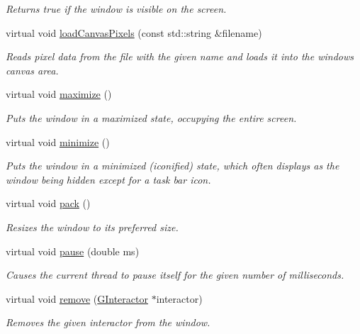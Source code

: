 \begin{DoxyCompactItemize}
\begin{DoxyCompactList}\small\item\em Returns true if the window is visible on the screen. \end{DoxyCompactList}\item 
virtual void \mbox{\hyperlink{classGWindow_ae2462f15e288c06c5136e31a8ac8151c}{load\+Canvas\+Pixels}} (const std\+::string \&filename)
\begin{DoxyCompactList}\small\item\em Reads pixel data from the file with the given name and loads it into the window\textquotesingle{}s canvas area. \end{DoxyCompactList}\item 
virtual void \mbox{\hyperlink{classGWindow_a1aa481996525792213f28d91fbb4894b}{maximize}} ()
\begin{DoxyCompactList}\small\item\em Puts the window in a maximized state, occupying the entire screen. \end{DoxyCompactList}\item 
virtual void \mbox{\hyperlink{classGWindow_a85ffaebe489c0ecf8051715ecf59babb}{minimize}} ()
\begin{DoxyCompactList}\small\item\em Puts the window in a minimized (iconified) state, which often displays as the window being hidden except for a task bar icon. \end{DoxyCompactList}\item 
virtual void \mbox{\hyperlink{classGWindow_a915ffc82b17862ab1d2a466a79d23a3f}{pack}} ()
\begin{DoxyCompactList}\small\item\em Resizes the window to its preferred size. \end{DoxyCompactList}\item 
virtual void \mbox{\hyperlink{classGWindow_adc7d99bb2dc43b8337e89b7d54cab9d3}{pause}} (double ms)
\begin{DoxyCompactList}\small\item\em Causes the current thread to pause itself for the given number of milliseconds. \end{DoxyCompactList}\item 
virtual void \mbox{\hyperlink{classGWindow_a1c12b1fde5c2ef10d79d4ee51e670efa}{remove}} (\mbox{\hyperlink{classGInteractor}{G\+Interactor}} $\ast$interactor)
\begin{DoxyCompactList}\small\item\em Removes the given interactor from the window. \end{DoxyCompactList}\item 

\end{DoxyCompactItemize}
